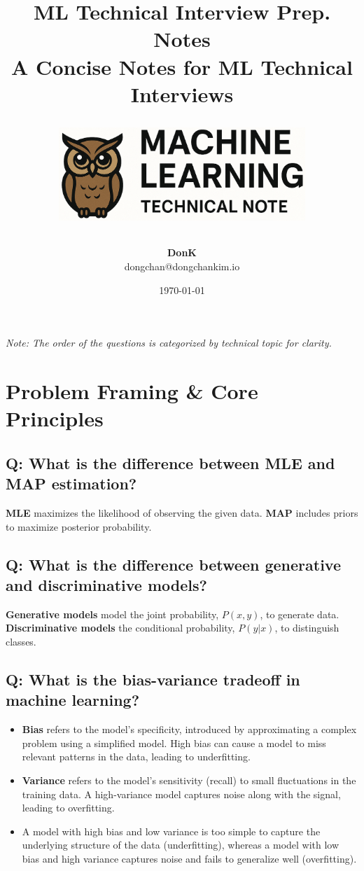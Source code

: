 \documentclass[11pt]{article}
\title{
  \vspace{1cm}
  \Huge\textbf{ML Technical Interview Prep. Notes} \\
  \vspace{0.5cm}
  \large A Concise Notes for ML Technical Interviews \\
  \vspace{5cm}
  \begin{center}
    \includegraphics[width=0.7\textwidth]{p_logo.png}
  \end{center}
  \vspace{5cm}
}
\author{\textbf{DonK} \\
\small dongchan@dongchankim.io}
\date{\today}
\begin{document}
\begin{titlepage}
	\maketitle
	\thispagestyle{empty}
	\vspace*{\fill}
	\small\textit{Note: The order of the questions is categorized by technical topic for clarity.}
\end{titlepage}

\tableofcontents
\thispagestyle{empty}
\newpage


\section{Problem Framing \& Core Principles}

\subsection*{Q: What is the difference between MLE and MAP estimation?}
\textbf{MLE} maximizes the likelihood of observing the given data. \textbf{MAP} includes priors to maximize posterior probability.

\subsection*{Q: What is the difference between generative and discriminative models?}
\textbf{Generative models} model the joint probability, \(P(x, y)\), to generate data. \textbf{Discriminative models} the conditional probability, \(P(y|x)\), to distinguish classes.

\subsection*{Q: What is the bias-variance tradeoff in machine learning?}
\begin{itemize}
	\item \textbf{Bias} refers to the model's specificity, introduced by approximating a complex problem using a simplified model. High bias can cause a model to miss relevant patterns in the data, leading to underfitting.
	\item \textbf{Variance} refers to the model's sensitivity (recall) to small fluctuations in the training data. A high-variance model captures noise along with the signal, leading to overfitting.
	\item A model with high bias and low variance is too simple to capture the underlying structure of the data (underfitting), whereas a model with low bias and high variance captures noise and fails to generalize well (overfitting).
\end{itemize}
\end{document}
